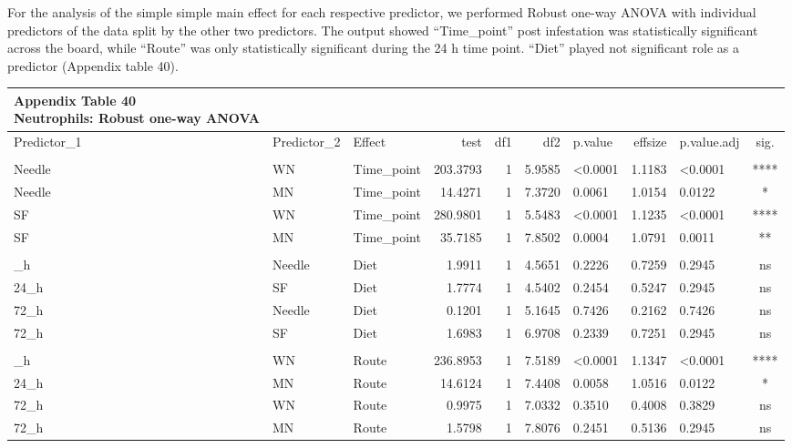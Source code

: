 \documentclass[
  12pt,
  letterpaper,
]{article}
\begin{document}
For the analysis of the simple simple main effect for each respective predictor, we performed Robust one-way ANOVA with individual predictors of the data split by the other two predictors. The output showed ``Time\_point'' post infestation was statistically significant across the board, while ``Route'' was only statistically significant during the 24 h time point. ``Diet'' played not significant role as a predictor (Appendix table 40).

\begingroup
\fontsize{12.0pt}{14.4pt}\selectfont
\begin{longtable}{lllrrrlrlc}
\caption*{
{\large \textbf{Appendix Table 40}} \\ 
{\small \textbf{Neutrophils: Robust one-way ANOVA}}
} \\ 
\toprule
Predictor\_1 & Predictor\_2 & {Effect} & {test} & {df1} & {df2} & {p.value} & {effsize} & {p.value.adj} & {sig.} \\ 
\midrule\addlinespace[2.5pt]
\multicolumn{10}{l}{Predictor: Time\_point} \\[2.5pt] 
\midrule\addlinespace[2.5pt]
Needle & WN & Time\_point & 203.3793 & 1 & 5.9585 & <0.0001 & 1.1183 & <0.0001 & **** \\ 
Needle & MN & Time\_point & 14.4271 & 1 & 7.3720 & 0.0061 & 1.0154 & 0.0122 & * \\ 
SF & WN & Time\_point & 280.9801 & 1 & 5.5483 & <0.0001 & 1.1235 & <0.0001 & **** \\ 
SF & MN & Time\_point & 35.7185 & 1 & 7.8502 & 0.0004 & 1.0791 & 0.0011 & ** \\ 
\midrule\addlinespace[2.5pt]
\multicolumn{10}{l}{Predictor: Diet} \\[2.5pt] 
\midrule\addlinespace[2.5pt]
24\_h & Needle & Diet & 1.9911 & 1 & 4.5651 & 0.2226 & 0.7259 & 0.2945 & ns \\ 
24\_h & SF & Diet & 1.7774 & 1 & 4.5402 & 0.2454 & 0.5247 & 0.2945 & ns \\ 
72\_h & Needle & Diet & 0.1201 & 1 & 5.1645 & 0.7426 & 0.2162 & 0.7426 & ns \\ 
72\_h & SF & Diet & 1.6983 & 1 & 6.9708 & 0.2339 & 0.7251 & 0.2945 & ns \\ 
\midrule\addlinespace[2.5pt]
\multicolumn{10}{l}{Predictor: Route} \\[2.5pt] 
\midrule\addlinespace[2.5pt]
24\_h & WN & Route & 236.8953 & 1 & 7.5189 & <0.0001 & 1.1347 & <0.0001 & **** \\ 
24\_h & MN & Route & 14.6124 & 1 & 7.4408 & 0.0058 & 1.0516 & 0.0122 & * \\ 
72\_h & WN & Route & 0.9975 & 1 & 7.0332 & 0.3510 & 0.4008 & 0.3829 & ns \\ 
72\_h & MN & Route & 1.5798 & 1 & 7.8076 & 0.2451 & 0.5136 & 0.2945 & ns \\ 
\bottomrule
\end{longtable}
\endgroup
\end{document}
